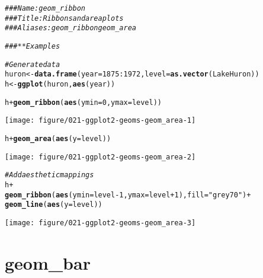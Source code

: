 \documentclass[a4paper,titlepage]{tufte-handout}\usepackage[]{graphicx}\usepackage[]{color}
\makeatletter
\def\maxwidth{ %
  \ifdim\Gin@nat@width>\linewidth
    \linewidth
  \else
    \Gin@nat@width
  \fi
}
\newcommand{\hlnum}[1]{\textcolor[rgb]{0.686,0.059,0.569}{#1}}%
\newcommand{\hlstr}[1]{\textcolor[rgb]{0.192,0.494,0.8}{#1}}%
\newcommand{\hlcom}[1]{\textcolor[rgb]{0.678,0.584,0.686}{\textit{#1}}}%
\newcommand{\hlopt}[1]{\textcolor[rgb]{0,0,0}{#1}}%
\newcommand{\hlstd}[1]{\textcolor[rgb]{0.345,0.345,0.345}{#1}}%
\newcommand{\hlkwb}[1]{\textcolor[rgb]{0.69,0.353,0.396}{#1}}%
\newcommand{\hlkwc}[1]{\textcolor[rgb]{0.333,0.667,0.333}{#1}}%
\newcommand{\hlkwd}[1]{\textcolor[rgb]{0.737,0.353,0.396}{\textbf{#1}}}%
\newenvironment{kframe}{%
 \def\at@end@of@kframe{}%
 \ifinner\ifhmode%
  \def\at@end@of@kframe{\end{minipage}}%
  \begin{minipage}{\columnwidth}%
 \fi\fi%
 \def\FrameCommand##1{\hskip\@totalleftmargin \hskip-\fboxsep
 \colorbox{shadecolor}{##1}\hskip-\fboxsep
     \hskip-\linewidth \hskip-\@totalleftmargin \hskip\columnwidth}%
 \MakeFramed {\advance\hsize-\width
   \@totalleftmargin\z@ \linewidth\hsize
   \@setminipage}}%
 {\par\unskip\endMakeFramed%
 \at@end@of@kframe}
\newenvironment{knitrout}{}{} %
\makeatother
\begin{document}
\begin{knitrout}
\color{fgcolor}\begin{kframe}
\begin{alltt}
\hlcom{### Name: geom_ribbon}
\hlcom{### Title: Ribbons and area plots}
\hlcom{### Aliases: geom_ribbon geom_area}

\hlcom{### ** Examples}

\hlcom{# Generate data}
\hlstd{huron} \hlkwb{<-} \hlkwd{data.frame}\hlstd{(}\hlkwc{year} \hlstd{=} \hlnum{1875}\hlopt{:}\hlnum{1972}\hlstd{,} \hlkwc{level} \hlstd{=} \hlkwd{as.vector}\hlstd{(LakeHuron))}
\hlstd{h} \hlkwb{<-} \hlkwd{ggplot}\hlstd{(huron,} \hlkwd{aes}\hlstd{(year))}

\hlstd{h} \hlopt{+} \hlkwd{geom_ribbon}\hlstd{(}\hlkwd{aes}\hlstd{(}\hlkwc{ymin}\hlstd{=}\hlnum{0}\hlstd{,} \hlkwc{ymax}\hlstd{=level))}
\end{alltt}
\end{kframe}
\texttt{[image: figure/021-ggplot2-geoms-geom\_area-1]} 
\begin{kframe}\begin{alltt}
\hlstd{h} \hlopt{+} \hlkwd{geom_area}\hlstd{(}\hlkwd{aes}\hlstd{(}\hlkwc{y} \hlstd{= level))}
\end{alltt}
\end{kframe}
\texttt{[image: figure/021-ggplot2-geoms-geom\_area-2]} 
\begin{kframe}\begin{alltt}
\hlcom{# Add aesthetic mappings}
\hlstd{h} \hlopt{+}
  \hlkwd{geom_ribbon}\hlstd{(}\hlkwd{aes}\hlstd{(}\hlkwc{ymin} \hlstd{= level} \hlopt{-} \hlnum{1}\hlstd{,} \hlkwc{ymax} \hlstd{= level} \hlopt{+} \hlnum{1}\hlstd{),} \hlkwc{fill} \hlstd{=} \hlstr{"grey70"}\hlstd{)} \hlopt{+}
  \hlkwd{geom_line}\hlstd{(}\hlkwd{aes}\hlstd{(}\hlkwc{y} \hlstd{= level))}
\end{alltt}
\end{kframe}
\texttt{[image: figure/021-ggplot2-geoms-geom\_area-3]} 

\end{knitrout}


\section{geom\_bar}
\end{document}

